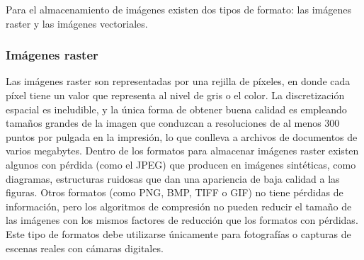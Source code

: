 





Para el almacenamiento de imágenes existen dos tipos de formato: las imágenes
raster y las imágenes vectoriales.

\subsubsection{Imágenes raster}

Las imágenes raster son representadas por una rejilla de píxeles, en donde cada
píxel tiene un valor que representa al nivel de gris o el color. La
discretización espacial es ineludible, y la única forma de obtener buena
calidad es empleando tamaños grandes de la imagen que conduzcan a resoluciones
de al menos 300 puntos por pulgada en la impresión, lo que conlleva a archivos
de documentos de varios megabytes. Dentro de los formatos para almacenar
imágenes raster existen algunos con pérdida (como el JPEG) que producen en
imágenes sintéticas, como diagramas, estructuras ruidosas que dan una
apariencia de baja calidad a las figuras. Otros formatos (como PNG, BMP, TIFF o
GIF) no tiene pérdidas de información, pero los algoritmos de compresión no
pueden reducir el tamaño de las imágenes con los mismos factores de reducción
que los formatos con pérdidas. Este tipo de formatos debe utilizarse únicamente
para fotografías o capturas de escenas reales con cámaras digitales.

